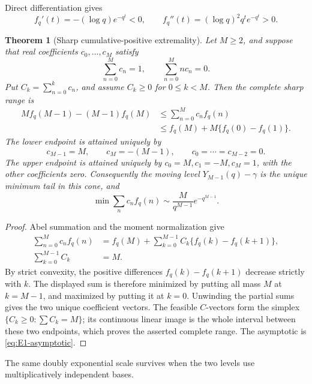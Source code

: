 \documentclass[11pt]{article}
\newtheorem{theorem}{Theorem}[section]
\theoremstyle{definition}
\theoremstyle{remark}
\begin{document}
Direct differentiation gives
\begin{equation}\label{eq:fq-convex}
 f_q'(t)=-(\log q)e^{-q^t}<0,
 \qquad
 f_q''(t)=(\log q)^2q^te^{-q^t}>0.
\end{equation}

\begin{theorem}[Sharp cumulative-positive extremality]
\label{thm:augmentation-extremality}
Let \(M\ge2\), and suppose that real coefficients \(c_0,\ldots,c_M\)
satisfy
\[
 \sum_{n=0}^Mc_n=1,
 \qquad
 \sum_{n=0}^Mnc_n=0.
\]
Put \(C_k=\sum_{n=0}^kc_n\), and assume \(C_k\ge0\) for \(0\le k<M\).
Then the complete sharp range is
\begin{equation}\label{eq:augmentation-range}
 \begin{split}
 M f_q(M-1)-(M-1)f_q(M)
 &\le \sum_{n=0}^Mc_nf_q(n)\\
 &\le f_q(M)+M\{f_q(0)-f_q(1)\}.
 \end{split}
\end{equation}
The lower endpoint is attained uniquely by
\begin{equation}\label{eq:augmentation-minimizer}
 c_{M-1}=M,\qquad c_M=-(M-1),
 \qquad c_0=\cdots=c_{M-2}=0.
\end{equation}
The upper endpoint is attained uniquely by
\(c_0=M,c_1=-M,c_M=1\), with the other coefficients zero.
Consequently the moving level \(Y_{M-1}(q)-\gamma\) is the unique minimum
tail in this cone, and
\[
 \min\sum_nc_nf_q(n)
 \sim \frac{M}{q^{M-1}}e^{-q^{M-1}}.
\]
\end{theorem}

\begin{proof}
Abel summation and the moment normalization give
\begin{align*}
 \sum_{n=0}^Mc_nf_q(n)
 &=f_q(M)+\sum_{k=0}^{M-1}C_k\{f_q(k)-f_q(k+1)\},\\
 \sum_{k=0}^{M-1}C_k&=M.
\end{align*}
By strict convexity, the positive differences
\(f_q(k)-f_q(k+1)\) decrease strictly with \(k\).  The displayed sum is
therefore minimized by putting all mass \(M\) at \(k=M-1\), and maximized
by putting it at \(k=0\).  Unwinding the partial sums gives the two unique
coefficient vectors.  The feasible \(C\)-vectors form the simplex
\(\{C_k\ge0:\sum C_k=M\}\); its continuous linear image is the whole
interval between these two endpoints, which proves the asserted complete
range.  The asymptotic is \eqref{eq:E1-asymptotic}.
\end{proof}

The same doubly exponential scale survives when the two levels use
multiplicatively independent bases.
\end{document}

